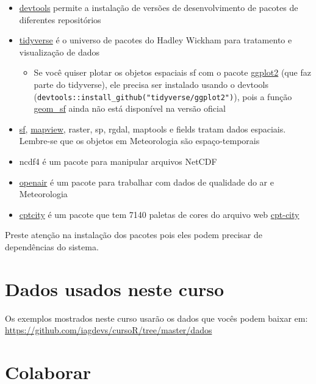 \documentclass[]{book}
\providecommand{\tightlist}{%
  \setlength{\itemsep}{0pt}\setlength{\parskip}{0pt}}
\theoremstyle{definition}
\theoremstyle{definition}
\theoremstyle{definition}
\theoremstyle{remark}
\begin{document}
\begin{itemize}
\tightlist
\item
  \href{https://CRAN.R-project.org/package=devtools}{devtools} permite a
  instalação de versões de desenvolvimento de pacotes de diferentes
  repositórios
\item
  \href{https://github.com/tidyverse}{tidyverse} é o universo de pacotes
  do Hadley Wickham para tratamento e visualização de dados

  \begin{itemize}
  \tightlist
  \item
    Se você quiser plotar os objetos espaciais sf com o pacote
    \href{http://ggplot2.tidyverse.org/}{ggplot2} (que faz parte do
    tidyverse), ele precisa ser instalado usando o devtools
    (\texttt{devtools::install\_github("tidyverse/ggplot2")}), pois a
    função \href{https://www.isgeomsfinggplot2yet.site/}{geom\_sf} ainda
    não está disponível na versão oficial
  \end{itemize}
\item
  \href{https://github.com/r-spatial/sf}{sf},
  \href{https://github.com/r-spatial/mapview}{mapview}, raster, sp,
  rgdal, maptools e fields tratam dados espaciais. Lembre-se que os
  objetos em Meteorologia são espaço-temporais
\item
  ncdf4 é um pacote para manipular arquivos NetCDF
\item
  \href{http://davidcarslaw.github.io/openair/}{openair} é um pacote
  para trabalhar com dados de qualidade do ar e Meteorologia
\item
  \href{https://ibarraespinosa.github.io/cptcity/}{cptcity} é um pacote
  que tem 7140 paletas de cores do arquivo web
  \href{http://soliton.vm.bytemark.co.uk/pub/cpt-city/index.html}{cpt-city}
\end{itemize}

Preste atenção na instalação dos pacotes pois eles podem precisar de
dependências do sistema.

\section{Dados usados neste curso}\label{dados-usados-neste-curso}

Os exemplos mostrados neste curso usarão os dados que vocês podem baixar
em: \url{https://github.com/iagdevs/cursoR/tree/master/dados}

\section{Colaborar}\label{colaborar}
\end{document}
